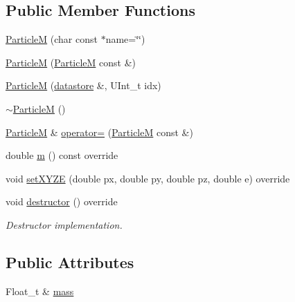\subsection*{Public Member Functions}
\begin{DoxyCompactItemize}
\item 
\hyperlink{classpanda_1_1ParticleM_af77a2005ee7665cbc507121351f0fa8a}{ParticleM} (char const $\ast$name=\char`\"{}\char`\"{})
\item 
\hyperlink{classpanda_1_1ParticleM_ad0b7348a6d2f24df6f9abac2f5d86a64}{ParticleM} (\hyperlink{classpanda_1_1ParticleM}{ParticleM} const \&)
\item 
\hyperlink{classpanda_1_1ParticleM_ad6374154fe587a4e4fbd6eb5eb3957a0}{ParticleM} (\hyperlink{structpanda_1_1Element_1_1datastore}{datastore} \&, UInt\_\-t idx)
\item 
\hyperlink{classpanda_1_1ParticleM_a887046812b7972d5c76d0440d04a6f0a}{$\sim$ParticleM} ()
\item 
\hyperlink{classpanda_1_1ParticleM}{ParticleM} \& \hyperlink{classpanda_1_1ParticleM_a37f7be4e1150b6080b47b005af730af5}{operator=} (\hyperlink{classpanda_1_1ParticleM}{ParticleM} const \&)
\item 
double \hyperlink{classpanda_1_1ParticleM_a3285647972bb49a26897e300f990b902}{m} () const override
\item 
void \hyperlink{classpanda_1_1ParticleM_a725a5be9c884b3819322f1cfd6b83010}{setXYZE} (double px, double py, double pz, double e) override
\item 
void \hyperlink{classpanda_1_1ParticleM_abef15d28e6e33ee92c0b318bd41af2ca}{destructor} () override
\begin{DoxyCompactList}\small\item\em Destructor implementation. \item\end{DoxyCompactList}\end{DoxyCompactItemize}
\subsection*{Public Attributes}
\begin{DoxyCompactItemize}
\item 
Float\_\-t \& \hyperlink{classpanda_1_1ParticleM_afdf143108cea4cf0346b0b72ded0f640}{mass}
\end{DoxyCompactItemize}
